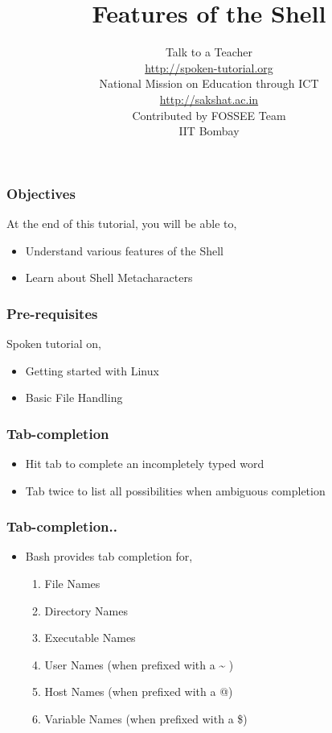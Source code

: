 \documentclass[17pt,compress]{beamer}
\author[FOSSEE]{}
\institute[IIT Bombay]{}
\date[]{}
\begin{document}
\sffamily \bfseries
\title
[Features of the Shell]
{Features of the Shell}
\author
[FOSSEE]
{\small Talk to a Teacher\\{\color{blue}\url{http://spoken-tutorial.org}}\\\vspace{0.25cm}National Mission on Education
 through ICT\\{\color{blue}\url{ http://sakshat.ac.in}} \\ [1.65cm]
   Contributed by FOSSEE Team \\IIT Bombay  \\[0.3cm]
}

\begin{frame}
   \titlepage
\end{frame}

\begin{frame}
\frametitle{Objectives}
\label{sec-2}

At the end of this tutorial, you will be able to,
\begin{itemize}
\item Understand various features of the Shell
\item Learn about Shell Metacharacters
\end{itemize}
\end{frame}

\begin{frame}
\frametitle{Pre-requisites}
\label{sec-3}

Spoken tutorial on,
\begin{itemize}
\item Getting started with Linux
\item Basic File Handling
\end{itemize}
\end{frame}

\begin{frame}[fragile]
\frametitle{Tab-completion}
\begin{itemize}
\item Hit tab to complete an incompletely typed word
\item Tab twice to list all possibilities when ambiguous completion
\end{itemize}
\end{frame}

\begin{frame}[fragile]
  \frametitle{Tab-completion..}
  \begin{itemize}
  \item Bash provides tab completion for,
    \begin{enumerate}
    \item File Names
    \item Directory Names
    \item Executable Names
    \item User Names (when prefixed with a \~{} )
    \item Host Names (when prefixed with a @)
    \item Variable Names (when prefixed with a \$)
    \end{enumerate}
  \end{itemize}
\end{frame}
\end{document}
